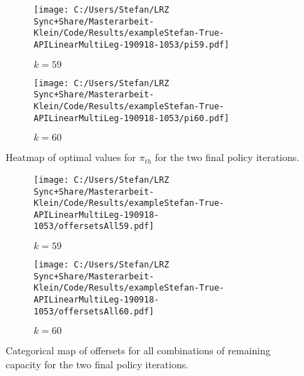\begin{figure}[H]
	\begin{subfigure}[t]{.5\textwidth}
		\centering	
		\texttt{[image: C:/Users/Stefan/LRZ Sync+Share/Masterarbeit-Klein/Code/Results/exampleStefan-True-APILinearMultiLeg-190918-1053/pi59.pdf]}
		\caption{\label{fig-adp-pi59} $k=59$}
	\end{subfigure}%
	\begin{subfigure}[t]{.5\textwidth}
		\centering
		\texttt{[image: C:/Users/Stefan/LRZ Sync+Share/Masterarbeit-Klein/Code/Results/exampleStefan-True-APILinearMultiLeg-190918-1053/pi60.pdf]}
		\caption{\label{fig-adp-pi60} $k=60$}
	\end{subfigure}
	\caption{\label{fig-adp-pi}Heatmap of optimal values for $\pi_{th}$ for the two final policy iterations.}
\end{figure}

\begin{figure}[H]
	\begin{subfigure}[t]{.5\textwidth}
		\centering	
		\texttt{[image: C:/Users/Stefan/LRZ Sync+Share/Masterarbeit-Klein/Code/Results/exampleStefan-True-APILinearMultiLeg-190918-1053/offersetsAll59.pdf]}
		\caption{\label{fig-adp-offersets59} $k=59$}
	\end{subfigure}%
	\begin{subfigure}[t]{.5\textwidth}
		\centering
		\texttt{[image: C:/Users/Stefan/LRZ Sync+Share/Masterarbeit-Klein/Code/Results/exampleStefan-True-APILinearMultiLeg-190918-1053/offersetsAll60.pdf]}
		\caption{\label{fig-adp-offersets60} $k=60$}
	\end{subfigure}
	\caption[Categorical maps of offersets for all combinations of remaining capacity.]{\label{fig-adp-offersets}Categorical map of offersets for all combinations of remaining capacity for the two final policy iterations.}
\end{figure}